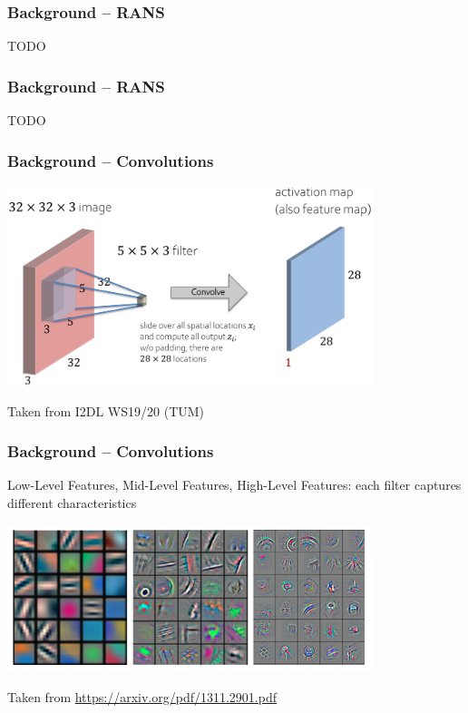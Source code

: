 \begin{frame}
    \frametitle{Background -- RANS}
 TODO
\end{frame}
\clearpage

\begin{frame}
    \frametitle{Background -- RANS} 
 TODO
\end{frame}
\clearpage

\begin{frame}
    \frametitle{Background -- Convolutions}
\vspace*{5mm}
\includegraphics[width=0.8\textwidth, height=.55\textheight]{./Ressourcen/Praesentation/Bilder/conv_bsp.png}%

Taken from I2DL WS19/20 (TUM)
    
\end{frame}
\clearpage

\begin{frame}
    \frametitle{Background -- Convolutions}

Low-Level Features, Mid-Level Features, High-Level Features: each filter captures different characteristics

\includegraphics[width=0.8\textwidth, height=.55\textheight]{./Ressourcen/Praesentation/Bilder/features.png}%
\vspace*{-5mm}

Taken from \url{https://arxiv.org/pdf/1311.2901.pdf}   
    
\end{frame}
\clearpage